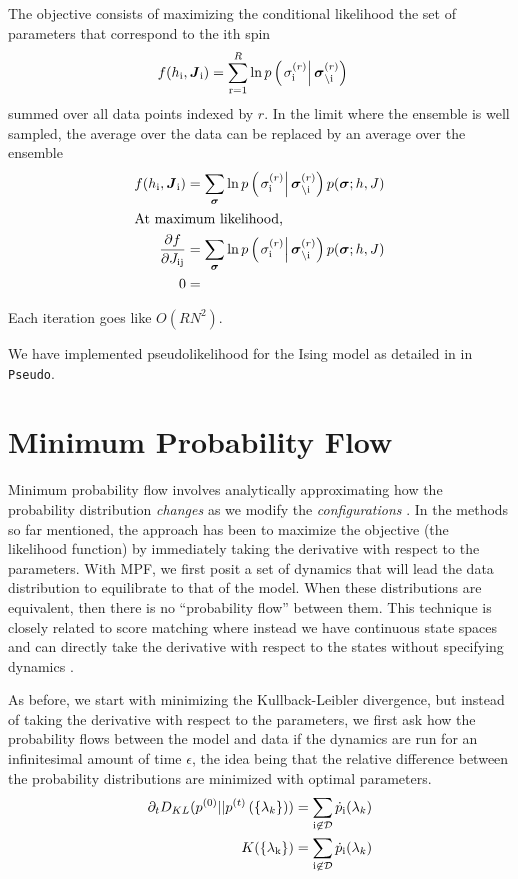 \documentclass[aps,prl,twocolumn]{revtex4-1}
\begin{document}
The objective consists of maximizing the conditional likelihood the set of parameters that correspond to the ith spin
\begin{align}
	f(h_{\rm i},\boldsymbol{J}_{\rm i}) &= \sum_{\rm r=1}^R \ln p\left(\left.\sigma_{\rm i}^{(r)}\right|\boldsymbol{\sigma}_{\backslash\rm i}^{(r)}\right)
\end{align}
summed over all data points indexed by $r$.
In the limit where the ensemble is well sampled, the average over the data can be replaced by an average over the ensemble
\begin{align}
	f(h_{\rm i},\boldsymbol{J}_{\rm i}) &= \sum_{\boldsymbol{\sigma}} \ln p\left(\left.\sigma_{\rm i}^{(r)}\right|\boldsymbol{\sigma}_{\backslash\rm i}^{(r)}\right)p(\boldsymbol{\sigma};h,J)\\
\intertext{At maximum likelihood,}
	\frac{\partial f}{\partial J_{\rm ij}} &= \sum_{\boldsymbol{\sigma}} \ln p\left(\left.\sigma_{\rm i}^{(r)}\right|\boldsymbol{\sigma}_{\backslash\rm i}^{(r)}\right)p(\boldsymbol{\sigma};h,J)\\
	0 &=
\end{align}

Each iteration goes like $O(RN^2)$.

We have implemented pseudolikelihood for the Ising model as detailed in \cite{Aurell:2012hi} in {\tt Pseudo}.

\section{Minimum Probability Flow}
Minimum probability flow involves analytically approximating how the probability distribution \textit{changes} as we modify the \textit{configurations} \cite{SohlDickstein:2011im}. In the methods so far mentioned, the approach has been to maximize the objective (the likelihood function) by immediately taking the derivative with respect to the parameters. With MPF, we first posit a set of dynamics that will lead the data distribution to equilibrate to that of the model. When these distributions are equivalent, then there is no ``probability flow'' between them. This technique is closely related to score matching where instead we have continuous state spaces and can directly take the derivative with respect to the states without specifying dynamics \cite{Hyvarinen:2007ed}.

As before, we start with minimizing the Kullback-Leibler divergence, but instead of taking the derivative with respect to the parameters, we first ask how the probability flows between the model and data if the dynamics are run for an infinitesimal amount of time $\epsilon$, the idea being that the relative difference between the probability distributions are minimized with optimal parameters.
\begin{align}
	\partial_t D_{KL}(p^{(0)}||p^{(t)}\left(\{\lambda_k\}\right)) &= \sum_{\rm i \not\in \mathcal{D}} \dot{p}_{\rm i}(\lambda_k)\\
	K(\{\lambda_{\rm k}\}) &= \sum_{\rm i \not\in \mathcal{D}} \dot{p}_{\rm i}(\lambda_k)
\end{align}
\end{document}
